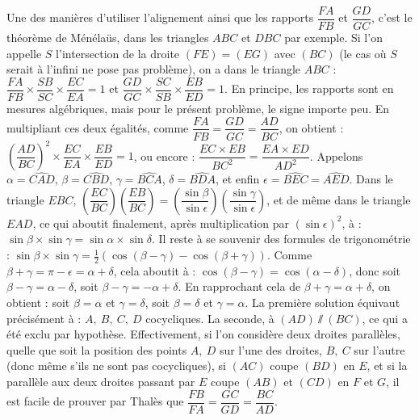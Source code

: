 \begin{sol}

Une des manières d'utiliser l'alignement ainsi que les rapports $\dfrac{FA}{FB}$ et $\dfrac{GD}{GC}$, c'est le théorème de Ménélaüs, dans les triangles $ABC$ et $DBC$ par exemple. Si l'on appelle $S$ l'intersection de la droite $(FE) = (EG)$ avec $(BC)$ (le cas où $S$ serait à l'infini ne pose pas problème), on a dans le triangle $ABC$ : $\dfrac{FA}{FB} \times \dfrac{SB}{SC} \times \dfrac{EC}{EA} = 1$ et $\dfrac{GD}{GC} \times \dfrac{SC}{SB} \times \dfrac{EB}{ED} = 1$. En principe, les rapports sont en mesures algébriques, mais pour le présent problème, le signe importe peu. En multipliant ces deux égalités, comme $\dfrac{FA}{FB} = \dfrac{GD}{GC} = \dfrac{AD}{BC}$, on obtient : $\left( \dfrac{AD}{BC} \right)^2 \times \dfrac{EC}{EA} \times \dfrac{EB}{ED} = 1$, ou encore : $\dfrac{EC \times EB}{BC^2} = \dfrac{EA \times ED}{AD^2}$. Appelons $\alpha = \widehat{CAD}$, $\beta = \widehat{CBD}$, $\gamma = \widehat{BCA}$, $\delta = \widehat{BDA}$, et enfin $\epsilon = \widehat{BEC} = \widehat{AED}$. Dans le triangle $EBC$, $\left( \dfrac{EC}{BC} \right) \left( \dfrac{EB}{BC} \right) = \left( \dfrac{\sin \beta}{\sin \epsilon} \right) \left( \dfrac{\sin \gamma}{\sin \epsilon} \right)$, et de même dans le triangle $EAD$, ce qui aboutit finalement, après multiplication par $(\sin \epsilon)^2$, à : $\sin \beta \times \sin \gamma = \sin \alpha \times \sin \delta$. Il reste à se souvenir des formules de trigonométrie : $\sin \beta \times \sin \gamma = \frac12 (\cos(\beta - \gamma) - \cos(\beta + \gamma))$. Comme $\beta + \gamma = \pi - \epsilon = \alpha + \delta$, cela aboutit à : $\cos (\beta - \gamma) = \cos (\alpha - \delta)$, donc soit $\beta - \gamma = \alpha - \delta$, soit $\beta - \gamma = - \alpha + \delta$. En rapprochant cela de $\beta + \gamma = \alpha + \delta$, on obtient : soit $\beta = \alpha$ et $\gamma = \delta$, soit $\beta = \delta$ et $\gamma = \alpha$. La première solution équivaut précisément à : $A, \ B, \ C, \ D$ cocycliques. La seconde, à $(AD) \sslash (BC)$, ce qui a été exclu par hypothèse. Effectivement, si l'on considère deux droites parallèles, quelle que soit la position des points $A, \ D$ sur l'une des droites, $B, \ C$ sur l'autre (donc même s'ils ne sont pas cocycliques), si $(AC)$ coupe $(BD)$ en $E$, et si la parallèle aux deux droites passant par $E$ coupe $(AB)$ et $(CD)$ en $F$ et $G$, il est facile de prouver par Thalès que $\dfrac{FB}{FA} = \dfrac{GC}{GD} = \dfrac{BC}{AD}$.

\end{sol}

